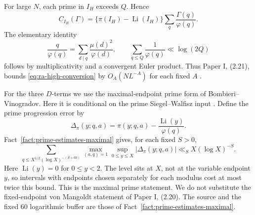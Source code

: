 For large \(N\), each prime in \(I_H\) exceeds \(Q\).
Hence
\begin{equation}\label{eq:ra-high-conversion}
 C_{I_H}(\Gamma)=
 \{\pi(I_H)-\operatorname{Li}(I_H)\}
          \sum_q\frac{\Gamma(q)}{\varphi(q)}.
\end{equation}
The elementary identity
\begin{equation}\label{eq:ra-totient-mass}
 \frac q{\varphi(q)}=\sum_{d\mid q}\frac{\mu(d)^2}{\varphi(d)},
 \qquad
 \sum_{q\le Q}\frac1{\varphi(q)}\ll\log(2Q)
\end{equation}
follows by multiplicativity and a convergent Euler product.
Thus Paper I, (2.21), bounds \eqref{eq:ra-high-conversion}
by \(O_A(NL^{-A})\) for each fixed \(A\)
\cite[(2.21)]{PaperI}.

For the three \(D\)-terms we use the maximal-endpoint prime form of
Bombieri--Vinogradov.
Here it is conditional on the prime Siegel--Walfisz input
\cite[(2.21)]{PaperI}. Define the prime progression error by
\begin{equation}\label{eq:ra-prime-error}
 \Delta_\pi(y;q,a)=\pi(y;q,a)-\frac{\operatorname{Li}(y)}{\varphi(q)}.
\end{equation}
Fact~\ref{fact:prime-estimates-maximal} gives, for each fixed \(S>0\),
\begin{equation}\label{eq:ra-prime-bv}
 \sum_{q\le X^{1/2}(\log X)^{-(S+60)}}
 \max_{(a,q)=1}\sup_{0\le y\le X}
 |\Delta_\pi(y;q,a)|\ll_S X(\log X)^{-S}.
\end{equation}
Here \(\operatorname{Li}(y)=0\) for \(0\le y<2\).
The level sits at \(X\), not at the variable endpoint \(y\),
so intervals with endpoints chosen separately for each
modulus cost at most twice this bound. This is the maximal prime statement.
We do not substitute the fixed-endpoint von Mangoldt statement of
Paper I, (2.20). The source and the fixed \(60\) logarithmic buffer
are those of Fact~\ref{fact:prime-estimates-maximal}.

